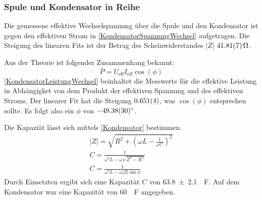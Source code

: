 \documentclass[
	a4paper,
	12pt,
	pagesize,
	ngerman
]{scrartcl}
\begin{document}
	\subsubsection*{Spule und Kondensator in Reihe}
	Die gemessene effektive Wechselspannung über die Spule und den Kondensator ist gegen den effektiven Strom in \cref{KondensatorSpannungWechsel} aufgetragen.
	Die Steigung des linearen Fits ist der Betrag des Scheinwiderstandes $|Z|$ $\SI{41,81 \pm 0,07}{\Omega}$. 

	Aus der Theorie ist folgender Zusammenhang bekannt:
	\begin{equation}
		\bar{P} = U_\text{eff} I_\text{eff} \cos(\phi)
	\end{equation}
	\cref{KondensatorLeistungWechsel} beinhaltet die Messwerte für die effektive Leistung in Abhängigket von dem Produkt der effektiven Spannung und des effektiven Stroms. 
	Der linearer Fit hat die Steigung $\SI{0,651 \pm 0,004}{}$, was $\cos(\phi)$ entsprechen sollte. 
	Es folgt also ein $\phi$ von $-\ang{49,38 \pm 0,30}$.

	Die Kapaziät lässt sich mittels \cref{Kondensator} bestimmen.
	\begin{gather}
		\label{Kondensator}
		|Z| = \sqrt{R^2 + (\omega L - \frac{1}{\omega C})^2} \\
		C = \frac{1}{\omega^2 L- \omega\sqrt{Z^2-R^2}} \\
		C = \frac{1}{\omega^2 L- \omega|Z|\sin{\phi}} 
	\end{gather}
	Durch Einsetzten ergibt sich eine Kapazität $C$ von \SI{63,8 \pm 2,1}{\mu F}. Auf dem Kondensator war eine Kapazität von \SI{60}{\mu F} angegeben.
\end{document}

